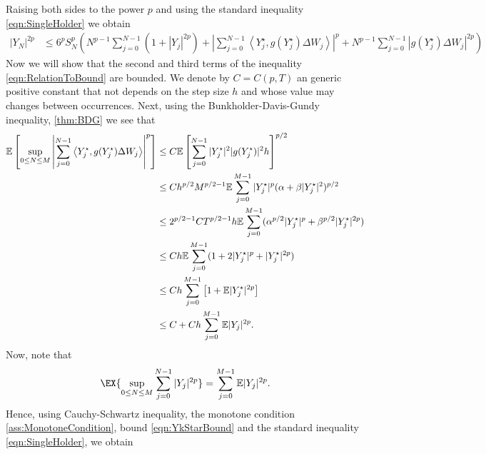 \documentclass[sort&compress, preprint]{elsarticle}
\theoremstyle{definition}
\theoremstyle{plain}%
\theoremstyle{remark}
\newcommand{\m}[1]{\mathbb{E}#1}
\newcommand{\innerprod}[2]{\left\langle#1, #2\right\rangle}
\begin{document}
\begin{pf}
	Raising both sides to the power $p$ and using the standard inequality \eqref{eqn:SingleHolder} we obtain
	\begin{align}\label{eqn:RelationToBound}
		|Y_N|^{2p}	
			&\leq
				6^{p} S_N^p
				\left(
					N^{p-1}
						\sum_{j=0}^{N-1}
						(1+|Y_j|^{2p})	
					+
					\left|
						\sum_{j=0}^{N-1}
						\innerprod{Y_j^{\star}}{g(Y_j^{\star}) \Delta W_j}
					\right|^p
					+
					N^{p-1}
					\sum_{j=0}^{N-1}
						\left|
							g(Y_j^{\star}) \Delta W_j
						\right|^{2 p}				
				\right)
	\end{align}
	Now we will show that the second and third terms of the inequality \eqref{eqn:RelationToBound} are bounded.
	We denote by $C=C(p,T)$ an generic positive constant that not depends on  the step size $h$ and whose
	value may changes between occurrences.
	Next, using the Bunkholder-Davis-Gundy inequality,
	\eqref{thm:BDG}
	we see that
	\begin{align}\label{eqn:BoundSecondTerm}
		\m
		\left[
			\sup_{0\leq N \leq M}
			\left|
				\sum_{j=0}^{N-1}
					\innerprod{Y_j^{\star}}{g(Y_j^{\star})\Delta W_j}
			\right|^{p}
		\right]
		&\leq
			C\m
			\left[
				\sum_{j=0}^{N-1}
					|Y_j^{\star}|^2
					|g(Y_j^{\star})|^2
					h
			\right]^{p/2}
			\notag\\
		&\leq
			C h^{p/2}M^{p/2-1}
			\m
				\sum_{j=0}^{M-1}
					|Y_j^{\star}|^p (\alpha +\beta |Y_j^{\star}|^2)^{p/2}
			\notag\\
		&\leq
			2^{p/2-1}C T^{p/2-1} h  
			\m
			\sum_{j=0}^{M-1}
				(\alpha^{p/2}|Y_j^{\star}|^p +\beta^{p/2} |Y_j^{\star}|^{2p})
			\notag\\
		&\leq
			C h
			\m
			\sum_{j=0}^{M-1}
				(1+2|Y_j^{\star}|^p + |Y_j^{\star}|^{2p})
			\notag\\
		&\leq
			C h 
			\sum_{j=0}^{M-1}
			\left[
				1+\m|Y_j^{\star}|^{2p}
			\right]
			\notag\\
		&\leq
			C 
			+ 
			C h 
			\sum_{j=0}^{M-1}
				\m|Y_j|^{2p}	
			.
	\end{align}
	Now, note that 
	\begin{equation}\label{eqn:SupOfSum}
		\EX{
			\sup_{0\leq N\leq M}
				\sum_{j=0}^{N-1}
				|Y_j|^{2p}
		}
		=
		\sum_{j=0}^{M-1}
			\m|Y_j|^{2p}.
	\end{equation}
	Hence, using Cauchy-Schwartz inequality, the monotone condition 
	\eqref{ass:MonotoneCondition}, bound \eqref{eqn:YkStarBound}
	and the standard inequality \eqref{eqn:SingleHolder}, we obtain
	\begin{align}

\end{align}
\end{pf}
\end{document}
